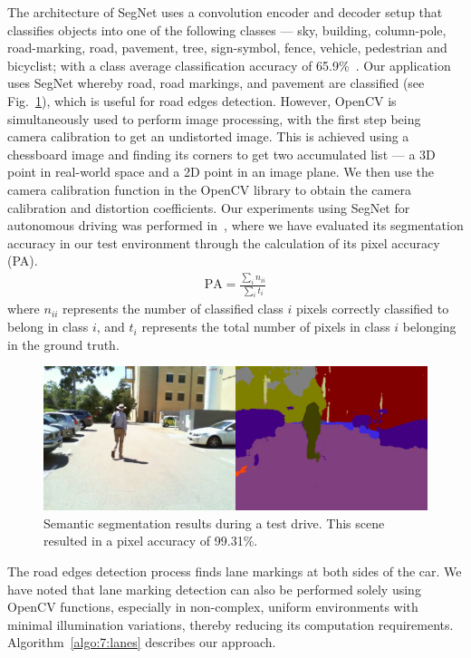 The architecture of SegNet uses a convolution encoder and decoder setup that classifies objects into one of the following classes --- sky, building, column-pole, road-marking, road, pavement, tree, sign-symbol, fence, vehicle, pedestrian and bicyclist; with a class average classification accuracy of 65.9\%~\cite{badrinarayanan_segnet:_2017}. Our application uses SegNet whereby road, road markings, and pavement are classified (see Fig.~\ref{fig:7:segnet}), which is useful for road edges detection. However, OpenCV is simultaneously used to perform image processing, with the first step being camera calibration to get an undistorted image. This is achieved using a chessboard image and finding its corners to get two accumulated list --- a 3D point in real-world space and a 2D point in an image plane. We then use the camera calibration function in the OpenCV library to obtain the camera calibration and distortion coefficients. Our experiments using SegNet for autonomous driving was performed in~\cite{k._l._lim_implementation_2017}, where we have evaluated its segmentation accuracy in our test environment through the calculation of its pixel accuracy (PA).
\begin{align}\label{eqn:PA}
\textrm{PA} = \frac{\sum_{i}n_{ii}}{\sum_{i}t_i}
\end{align}
where $n_{ii}$ represents the number of classified class $i$ pixels correctly classified to belong in class $i$, and $t_i$ represents the total number of pixels in class $i$ belonging in the ground truth.


\begin{figure}[H]
	\centering
	\includegraphics[width=0.8\linewidth]{segnet}
	\caption[Semantic segmentation results from test drive]{Semantic segmentation results during a test drive. This scene resulted in a pixel accuracy of 99.31\%.}
	\label{fig:7:segnet}
\end{figure}

The road edges detection process finds lane markings at both sides of the car. We have noted that lane marking detection can also be performed solely using OpenCV functions, especially in non-complex, uniform environments with minimal illumination variations, thereby reducing its computation requirements. Algorithm~\ref{algo:7:lanes} describes our approach.

